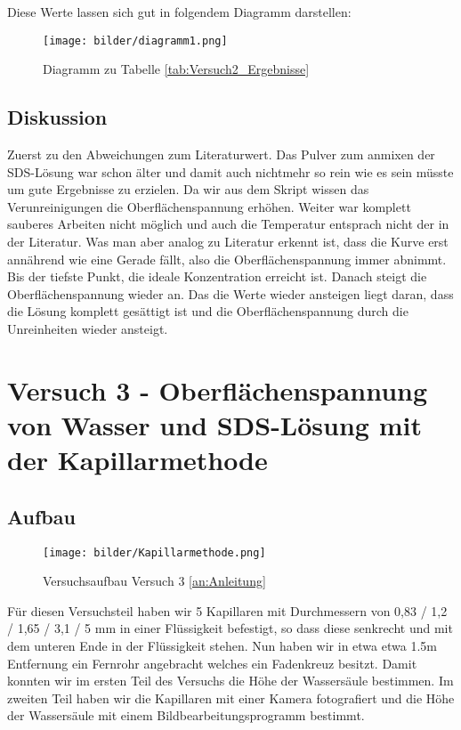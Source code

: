             Diese Werte lassen sich gut in folgendem Diagramm darstellen:

            \begin{figure}[H]
                \centering
                \caption{Diagramm zu Tabelle \ref{tab:Versuch2_Ergebnisse}}
                \label{fig:versuch2}
                \texttt{[image: bilder/diagramm1.png]}
            \end{figure}

        \subsection{Diskussion}
            
            Zuerst zu den Abweichungen zum Literaturwert. Das Pulver zum anmixen der SDS-Lösung war schon älter und damit auch nichtmehr so rein wie es sein müsste um gute Ergebnisse zu erzielen. Da wir aus dem Skript wissen das Verunreinigungen die Oberflächenspannung erhöhen. Weiter war komplett sauberes Arbeiten nicht möglich und auch die Temperatur entsprach nicht der in der Literatur. Was man aber analog zu Literatur erkennt ist, dass die Kurve erst annährend wie eine Gerade fällt, also die Oberflächenspannung immer abnimmt. Bis der tiefste Punkt, die ideale Konzentration erreicht ist. Danach steigt die Oberflächenspannung wieder an. Das die Werte wieder ansteigen liegt daran, dass die Lösung komplett gesättigt ist und die Oberflächenspannung durch die Unreinheiten wieder ansteigt.

    \section{Versuch 3 - Oberflächenspannung von Wasser und SDS-Lösung mit der Kapillarmethode}

        \subsection{Aufbau}

            \begin{figure}[H]
                \centering
                \texttt{[image: bilder/Kapillarmethode.png]}
                \caption{Versuchsaufbau Versuch 3 \ref{an:Anleitung}}
                \label{fig:Versuch3_Aufbau}
            \end{figure}

            Für diesen Versuchsteil haben wir 5 Kapillaren mit Durchmessern von 0,83 / 1,2 / 1,65 / 3,1 / 5 mm in einer Flüssigkeit befestigt, so dass diese senkrecht und mit dem unteren Ende in der Flüssigkeit stehen. Nun haben wir in etwa etwa 1.5m Entfernung ein Fernrohr angebracht welches ein Fadenkreuz besitzt. Damit konnten wir im ersten Teil des Versuchs die Höhe der Wassersäule bestimmen. Im zweiten Teil haben wir die Kapillaren mit einer Kamera fotografiert und die Höhe der Wassersäule mit einem Bildbearbeitungsprogramm bestimmt.

